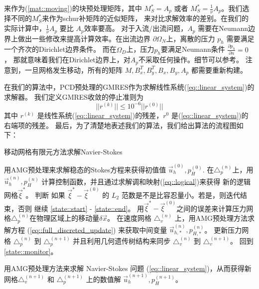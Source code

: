    来作为(\ref{mat::moving})的块预处理矩阵，其中 $M_S^* = A_p$ 或者 $M_S^* =
   \frac{1}{\nu} A_p$。我们选择不同的$M_S^*$来作为schur补矩阵的近似矩阵，
   来对比求解效率的差别。在我们的实际计算中，$\frac{1}{\nu}A_p$ 要比 $A_p$效率要高。
   对于入流/出流问题，$A_p$ 需要在Neumann边界上做出一些修改来提高计算效率。在出流边界
   $\partial \Omega_N$上，离散的压力 $p_h$ 需要满足一个齐次的Dirichlet边界条件。
   而在$\Omega_D$上，压力$p_h$要满足Neumann条件 $\frac{\partial p_h}{\partial n} = 0$，
   那就意味着我们在Dirichlet边界上，对$A_p$不采取任何操作。细节可以参考\cite{elman2009boundary}。
   注意到，一旦网格发生移动，所有的矩阵 $M, B_x^T, B_y^T, B_x, B_y, A_p$ 都需要重新构建。

   在我们的算法中，PCD预处理的GMRES作为求解线性系统(\ref{eq::linear_system})的求解器。
   我们定义GMRES收敛的停止准则为
   \begin{equation}
     ||r^{(k)}||  \leq 10^{-6} ||r^{(0)}||
   \end{equation}
   其中 $r^{(k)}$ 是线性系统(\ref{eq::linear_system})的残差，$r^{0}$ 是(\ref{eq::linear_system})的右端项的残差。
   最后，为了清楚地表述我们的算法，我们给出算法的流程图如下：

      \begin{algorithm}
        \caption{移动网格有限元方法求解Navier-Stokes}
        \begin{algorithmic}[1]
          \State 用AMG预处理来求解稳态的Stokes方程来获得初值值 $\vec{u}_h^{(0)}, p_H^{(0)}$.
          \State 在$\triangle_p^{(n)}$上，用 $\vec{u}_h^{(n)}, p_H^{(n)}$ 计算控制函数，并且通过求解调和映射(\ref{eq::logical})来获得
                 新的逻辑网格$\vec{\xi}^*$。 \label{state::monitor}
          \State 判断 如果 $\vec{\xi}^* - \vec{\xi}^{(0)}$ 的 $L_2$ 范数是不是比容忍量小。若是，则迭代结束，否则
                 继续 \ref{state::start} - \ref{state::end}。
          \State 用$\vec{\xi}^* - \vec{\xi}^{(0)}$之间的误差来计算压力网格$\triangle_p^{(n)}$在物理区域上的移动量$\delta \vec{x}$。
                 \label{state::start}
          \State 在速度网格 $\triangle_v^{(n)}$ 上，用AMG预处理方法求解方程 (\ref{eq::full_discreted_update}) 来获取中间变量
                 $\vec{u}_{h, *}^{(n)}, p_{H, *}^{(n)}$。
          \State 更新压力网格 $\triangle_p^{(n)}$ 到 $\triangle_p^{(n +
                 1)}$ 并且利用几何遗传树结构来同步 $\triangle_v^{(n)}$ 到
                 $\triangle_v^{(n + 1)}$。
          \State 回到 \ref{state::monitor}。 \label{state::end}

          \State 用AMG预处理方法来求解 Navier-Stokes 问题 (\ref{eq::linear_system})，从而获得新网格$\triangle_v^{(n + 1)}$ 和 $\triangle_p^{(n
                 + 1)}$ 上的数值解 $\vec{u}_h^{(n + 1)}, p_H^{(n + 1)}$。
          \EndWhile
        \end{algorithmic}
        \label{alg::solve}
      \end{algorithm}


